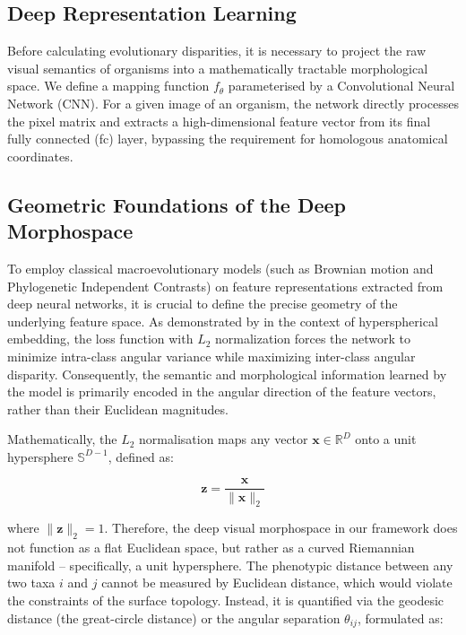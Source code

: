 \subsection{Deep Representation Learning}\label{subsec:mm-deep-learning}

Before calculating evolutionary disparities, it is necessary to project the raw visual semantics of organisms into a mathematically tractable morphological space. 
We define a mapping function $f_\theta$ parameterised by a Convolutional Neural Network (CNN). 
For a given image of an organism, the network directly processes the pixel matrix and extracts a high-dimensional feature vector from its final fully connected (fc) layer, bypassing the requirement for homologous anatomical coordinates.

\subsection{Geometric Foundations of the Deep Morphospace}\label{subsec:mm-geometric-foundations}

To employ classical macroevolutionary models (such as Brownian motion and Phylogenetic Independent Contrasts) 
on feature representations extracted from deep neural networks, it is crucial to define the precise geometry of the underlying feature space. 
As demonstrated by \textcite{Wang2017NormFace} in the context of hyperspherical embedding, the loss function with $L_2$ normalization forces 
the network to minimize intra-class angular variance while maximizing inter-class angular disparity. 
Consequently, the semantic and morphological information learned by the model is primarily encoded in the angular direction of the feature vectors, 
rather than their Euclidean magnitudes.

Mathematically, the $L_2$ normalisation maps any vector $\mathbf{x} \in \mathbb{R}^D$ onto a unit hypersphere $\mathbb{S}^{D-1}$, defined as:

$$\mathbf{z} = \frac{\mathbf{x}}{\|\mathbf{x}\|_2}$$

where $\|\mathbf{z}\|_2 = 1$. 
Therefore, the deep visual morphospace in our framework does not function as a flat Euclidean space, 
but rather as a curved Riemannian manifold -- specifically, a unit hypersphere. 
The phenotypic distance between any two taxa $i$ and $j$ cannot be measured by Euclidean distance, which would violate the constraints of the surface topology. 
Instead, it is quantified via the geodesic distance (the great-circle distance) or the angular separation $\theta_{ij}$, formulated as:

